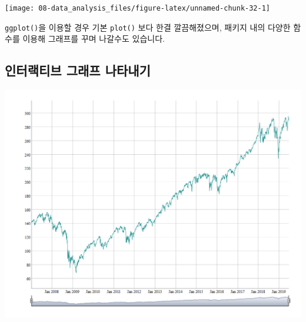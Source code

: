 \documentclass[12pt,]{book}
\newenvironment{Shaded}{\begin{snugshade}}{\end{snugshade}}
\newcommand{\DataTypeTok}[1]{\textcolor[rgb]{0.13,0.29,0.53}{#1}}
\newcommand{\KeywordTok}[1]{\textcolor[rgb]{0.13,0.29,0.53}{\textbf{#1}}}
\newcommand{\NormalTok}[1]{#1}
\newcommand{\OperatorTok}[1]{\textcolor[rgb]{0.81,0.36,0.00}{\textbf{#1}}}
\newcommand{\StringTok}[1]{\textcolor[rgb]{0.31,0.60,0.02}{#1}}
\begin{document}
\begin{Shaded}
\end{Shaded}

\begin{center}\texttt{[image: 08-data\_analysis\_files/figure-latex/unnamed-chunk-32-1]} \end{center}

\texttt{ggplot()}을 이용할 경우 기본 \texttt{plot()} 보다 한결 깔끔해졌으며, 패키지 내의 다양한 함수를 이용해 그래프를 꾸며 나갈수도 있습니다.

\hypertarget{section-43}{%
\subsection{인터랙티브 그래프 나타내기}\label{section-43}}

\begin{Shaded}
\end{Shaded}

\begin{center}\includegraphics[width=0.7\linewidth]{images/dygraph} \end{center}
\end{document}
